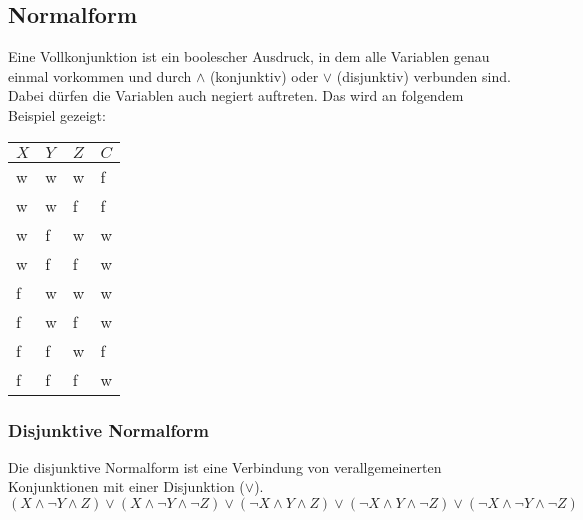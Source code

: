 \subsection{Normalform}
Eine Vollkonjunktion ist ein boolescher Ausdruck, in dem alle Variablen genau einmal vorkommen und durch $\wedge$ (konjunktiv) oder $\vee$ (disjunktiv) verbunden sind. Dabei dürfen die Variablen auch negiert auftreten.
Das wird an folgendem Beispiel gezeigt:

\begin{tabular}{|l|l|l||l|}
  \hline
  $X$ & $Y$ & $Z$ & $C$ \\
  \hline
  w & w & w & f \\
  w & w & f & f \\
  w & f & w & w \\
  w & f & f & w \\
  f & w & w & w \\
  f & w & f & w \\
  f & f & w & f \\
  f & f & f & w \\
  \hline
\end{tabular}

\begin{comment} %
\subsubsection{Negationsnormalform}
  Bei der Negationsnormalform dürfen Negationen ($\neg$) nur direkt vor
  einer Variable (und nicht vor einer Klammer) stehen:
  \[\neg (A \vee B) \Leftrightarrow \neg A \wedge \neg B\]
\subsubsection{Verallgemeinerte Konjunktion}
  Alle Variabeln werden mit der Konjunktion ($\wedge$) verbunden.
  Die einzelnen Variabeln liegen dabei immer in der Negationsnormalform vor:
  \[ X \wedge \neg Y \wedge Z\]
\end{comment}

\subsubsection{Disjunktive Normalform}
  Die disjunktive Normalform ist eine Verbindung von verallgemeinerten
  Konjunktionen mit einer Disjunktion ($\vee$).
  \[ (X \wedge \neg Y \wedge Z) \vee (X \wedge \neg Y \wedge \neg Z) \vee (\neg X \wedge Y \wedge Z)
    \vee (\neg X \wedge Y \wedge \neg Z) \vee (\neg X \wedge \neg Y \wedge \neg Z)\]
